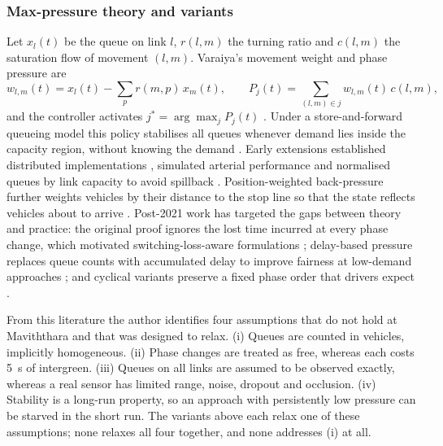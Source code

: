 \subsubsection{Max-pressure theory and variants}
Let $x_l(t)$ be the queue on link $l$, $r(l,m)$ the turning ratio and $c(l,m)$ the saturation flow of movement
$(l,m)$. Varaiya's movement weight and phase pressure are
\begin{equation}
  w_{l,m}(t) = x_l(t) - \sum_{p} r(m,p)\,x_m(t), \qquad
  P_j(t) = \sum_{(l,m)\in j} w_{l,m}(t)\,c(l,m),
  \label{eq:lit-mp}
\end{equation}
and the controller activates $j^\ast=\arg\max_j P_j(t)$ \cite{varaiya2013maxpressure}. Under a store-and-forward
queueing model this policy stabilises all queues whenever demand lies inside the capacity region, without
knowing the demand \cite{varaiya2013maxpressure,tassiulas1992}. Early extensions established distributed
implementations \cite{wongpiromsarn2012distributed}, simulated arterial performance \cite{kouvelas2014maxpressure}
and normalised queues by link capacity to avoid spillback \cite{gregoire2015capacity}. Position-weighted
back-pressure further weights vehicles by their distance to the stop line so that the state reflects vehicles
about to arrive \cite{li2019position}. Post-2021 work has targeted the gaps between theory and practice: the
original proof ignores the lost time incurred at every phase change, which motivated switching-loss-aware
formulations \cite{wang2022learning}; delay-based pressure replaces queue counts with accumulated delay to improve
fairness at low-demand approaches \cite{liu2022novel}; and cyclical variants preserve a fixed phase order that
drivers expect \cite{levin2023maxpressure,barman2022performance}.

From this literature the author identifies four assumptions that do not hold at Maviththara and that \prism{}
was designed to relax. (i) Queues are counted in vehicles, implicitly homogeneous. (ii) Phase changes are
treated as free, whereas each costs 5~s of intergreen. (iii) Queues on all links are assumed to be observed
exactly, whereas a real sensor has limited range, noise, dropout and occlusion. (iv) Stability is a long-run
property, so an approach with persistently low pressure can be starved in the short run. The variants above
each relax one of these assumptions; none relaxes all four together, and none addresses (i) at all.

